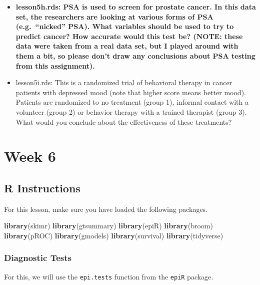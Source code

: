 \documentclass[]{book}
\newenvironment{Shaded}{\begin{snugshade}}{\end{snugshade}}
\newcommand{\KeywordTok}[1]{\textcolor[rgb]{0.13,0.29,0.53}{\textbf{#1}}}
\newcommand{\NormalTok}[1]{#1}
\begin{document}
\begin{itemize}
\item
  \textbf{lesson5h.rds: PSA is used to screen for prostate cancer. In this data set, the researchers are looking at various forms of PSA (e.g.~``nicked'' PSA). What variables should be used to try to predict cancer? How accurate would this test be? (NOTE: these data were taken from a real data set, but I played around with them a bit, so please don't draw any conclusions about PSA testing from this assignment).}
\item
  lesson5i.rds: This is a randomized trial of behavioral therapy in cancer patients with depressed mood (note that higher score means better mood). Patients are randomized to no treatment (group 1), informal contact with a volunteer (group 2) or behavior therapy with a trained therapist (group 3). What would you conclude about the effectiveness of these treatments?
\end{itemize}

\hypertarget{week-6}{%
\chapter{Week 6}\label{week-6}}

\hypertarget{r-instructions-5}{%
\section{R Instructions}\label{r-instructions-5}}

For this lesson, make sure you have loaded the following packages.

\begin{Shaded}
\begin{Highlighting}[]
\KeywordTok{library}\NormalTok{(skimr)}
\KeywordTok{library}\NormalTok{(gtsummary)}
\KeywordTok{library}\NormalTok{(epiR)}
\KeywordTok{library}\NormalTok{(broom)}
\KeywordTok{library}\NormalTok{(pROC)}
\KeywordTok{library}\NormalTok{(gmodels)}
\KeywordTok{library}\NormalTok{(survival)}
\KeywordTok{library}\NormalTok{(tidyverse)}
\end{Highlighting}
\end{Shaded}

\hypertarget{diagnostic-tests}{%
\subsection{Diagnostic Tests}\label{diagnostic-tests}}

For this, we will use the \texttt{epi.tests} function from the \texttt{epiR} package.
\end{document}
